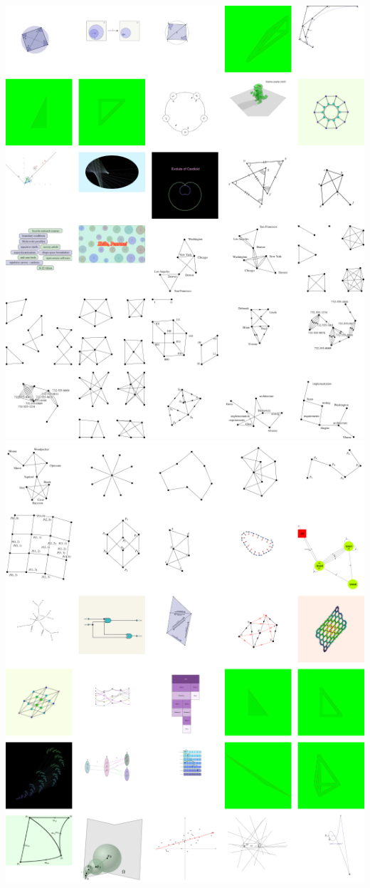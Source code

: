 \includegraphics[width=\linewidth]{assets/appendix/Group 9.png}
\pagebreak
\includegraphics[width=\linewidth]{assets/appendix/Group 10.png}
